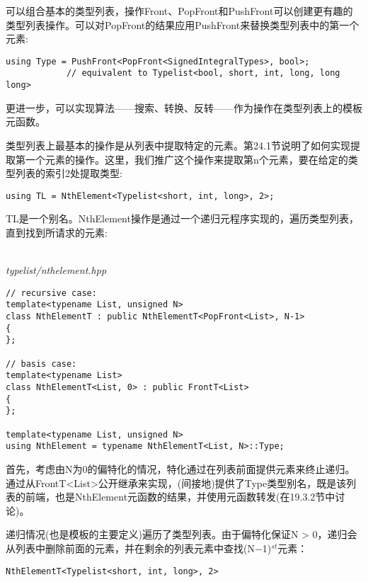 
可以组合基本的类型列表，操作Front、PopFront和PushFront可以创建更有趣的类型列表操作。可以对PopFront的结果应用PushFront来替换类型列表中的第一个元素:

\begin{lstlisting}[style=styleCXX]
using Type = PushFront<PopFront<SignedIntegralTypes>, bool>;
			// equivalent to Typelist<bool, short, int, long, long long>
\end{lstlisting}

更进一步，可以实现算法——搜索、转换、反转——作为操作在类型列表上的模板元函数。


类型列表上最基本的操作是从列表中提取特定的元素。第24.1节说明了如何实现提取第一个元素的操作。这里，我们推广这个操作来提取第n个元素，要在给定的类型列表的索引2处提取类型:

\begin{lstlisting}[style=styleCXX]
using TL = NthElement<Typelist<short, int, long>, 2>;
\end{lstlisting}

TL是一个别名。NthElement操作是通过一个递归元程序实现的，遍历类型列表，直到找到所请求的元素:

\hspace*{\fill} \\ %
\noindent
\textit{typelist/nthelement.hpp}
\begin{lstlisting}[style=styleCXX]
// recursive case:
template<typename List, unsigned N>
class NthElementT : public NthElementT<PopFront<List>, N-1>
{
};

// basis case:
template<typename List>
class NthElementT<List, 0> : public FrontT<List>
{
};

template<typename List, unsigned N>
using NthElement = typename NthElementT<List, N>::Type;
\end{lstlisting}

首先，考虑由N为0的偏特化的情况，特化通过在列表前面提供元素来终止递归。通过从FrontT<List>公开继承来实现，(间接地)提供了Type类型别名，既是该列表的前端，也是NthElement元函数的结果，并使用元函数转发(在19.3.2节中讨论)。

递归情况(也是模板的主要定义)遍历了类型列表。由于偏特化保证N > 0，递归会从列表中删除前面的元素，并在剩余的列表元素中查找(N−1)$ ^{st} $元素：

\begin{lstlisting}[style=styleCXX]
NthElementT<Typelist<short, int, long>, 2>
\end{lstlisting}

